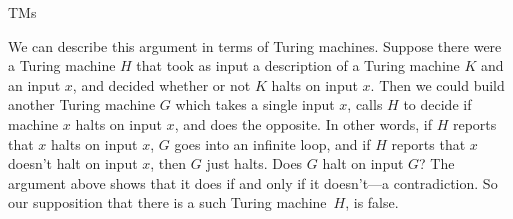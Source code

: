 \documentclass[../../../include/open-logic-section]{subfiles}
\begin{document}
\begin{tagblock}{TMs}
\begin{explain}
We can describe this argument in terms of Turing machines.  Suppose
there were a Turing machine $H$ that took as input a description
of a Turing machine $K$ and an input $x$, and decided whether or not
$K$ halts on input $x$. Then we could build another Turing machine $G$
which takes a single input $x$, calls $H$ to decide if machine $x$
halts on input $x$, and does the opposite. In other words, if $H$
reports that $x$ halts on input $x$, $G$ goes into an infinite loop,
and if $H$ reports that $x$ doesn't halt on input $x$, then $G$ just
halts. Does $G$ halt on input $G$? The argument above shows that it
does if and only if it doesn't---a contradiction. So our supposition that
there is a such Turing machine~$H$, is false.
\end{explain}
\end{tagblock}
\end{document}
